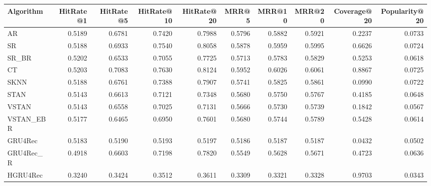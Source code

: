 \begin{tabular}{lrrrrrrrrr}
\toprule
 Algorithm &  HitRate@1 &  HitRate@5 &  HitRate@10 &  HitRate@20 &   MRR@5 &  MRR@10 &  MRR@20 &  Coverage@20 &  Popularity@20 \\
\midrule
        AR &     0.5189 &     0.6781 &      0.7420 &      0.7988 &  0.5796 &  0.5882 &  0.5921 &       0.2237 &         0.0733 \\
        SR &     0.5188 &     0.6933 &      0.7540 &      0.8058 &  0.5878 &  0.5959 &  0.5995 &       0.6626 &         0.0724 \\
     SR\_BR &     0.5202 &     0.6533 &      0.7055 &      0.7725 &  0.5713 &  0.5783 &  0.5829 &       0.5253 &         0.0618 \\
        CT &     0.5203 &     0.7083 &      0.7630 &      0.8124 &  0.5952 &  0.6026 &  0.6061 &       0.8867 &         0.0725 \\
      SKNN &     0.5188 &     0.6761 &      0.7388 &      0.7907 &  0.5741 &  0.5825 &  0.5861 &       0.0990 &         0.0722 \\
      STAN &     0.5143 &     0.6613 &      0.7121 &      0.7348 &  0.5680 &  0.5750 &  0.5767 &       0.4185 &         0.0648 \\
     VSTAN &     0.5143 &     0.6558 &      0.7025 &      0.7131 &  0.5666 &  0.5730 &  0.5739 &       0.1842 &         0.0567 \\
 VSTAN\_EBR &     0.5177 &     0.6465 &      0.6950 &      0.7601 &  0.5680 &  0.5744 &  0.5789 &       0.5428 &         0.0614 \\
   GRU4Rec &     0.5183 &     0.5190 &      0.5193 &      0.5197 &  0.5186 &  0.5187 &  0.5187 &       0.0432 &         0.0502 \\
 GRU4Rec\_R &     0.4918 &     0.6603 &      0.7198 &      0.7820 &  0.5549 &  0.5628 &  0.5671 &       0.4723 &         0.0636 \\
  HGRU4Rec &     0.3240 &     0.3424 &      0.3512 &      0.3611 &  0.3309 &  0.3321 &  0.3328 &       0.9703 &         0.0343 \\
\bottomrule
\end{tabular}
